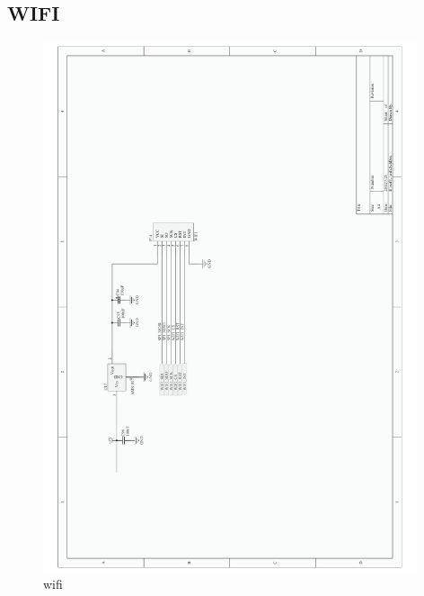 \documentclass[titlepage]{article}
\begin{document}
 \subsection{WIFI}
 \begin{figure}[ht]
  \centering
 \includegraphics[width=11cm]{wifi.pdf}
 \caption{wifi}
 \end{figure}

 \newpage
\end{document}
